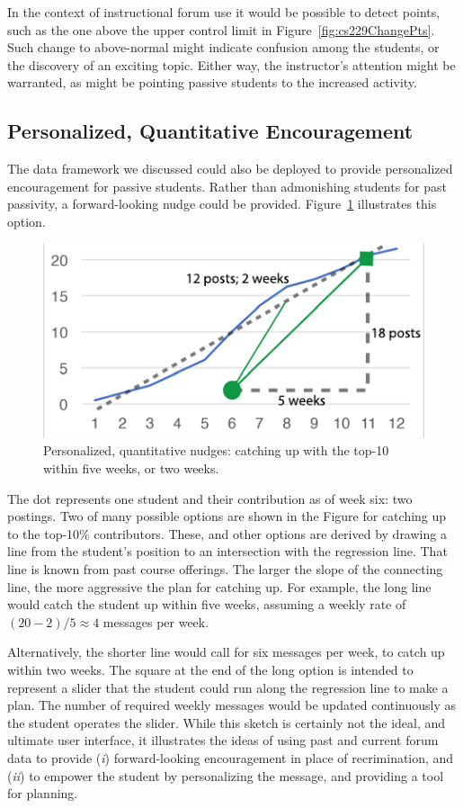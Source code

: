 In the context of instructional forum use it would be possible to
detect points, such as the one above the upper control limit in
Figure~\ref{fig:cs229ChangePts}. Such change to above-normal might
indicate confusion among the students, or the discovery of an exciting
topic. Either way, the instructor's attention might be warranted, as
might be pointing passive students to the increased activity.

\subsection{Personalized, Quantitative Encouragement}
The data framework we discussed could also be deployed to provide
personalized encouragement for passive students. Rather than
admonishing students for past passivity, a forward-looking nudge could
be provided. Figure~\ref{fig:nudgeAngles} illustrates this option.
\begin{figure}[]
       \centering
       \includegraphics{Figs/angleTrajectories.pdf}
       \caption{\textnormal{Personalized, quantitative nudges:
           catching up with the top-10 within five weeks, or two
           weeks.}}
       \label{fig:nudgeAngles}
\end{figure}
The dot represents one student and their contribution as of week six:
two postings. Two of many possible options are shown in the Figure for
catching up to the top-10\% contributors. These, and other options are
derived by drawing a line from the student's position to an
intersection with the regression line. That line is known from past
course offerings. The larger the slope of the connecting line, the
more aggressive the plan for catching up. For example, the long line
would catch the student up within five weeks, assuming a weekly rate
of $(20-2)/5 \approx 4$ messages per week.

Alternatively, the shorter line would call for six messages per week,
to catch up within two weeks. The square at the end of the long option
is intended to represent a slider that the student could run along the
regression line to make a plan. The number of required weekly messages
would be updated continuously as the student operates the
slider. While this sketch is certainly not the ideal, and ultimate
user interface, it illustrates the ideas of using past and current
forum data to provide ({\em i}) forward-looking encouragement in place
of recrimination, and ({\em ii}) to empower the student by
personalizing the message, and providing a tool for planning.

